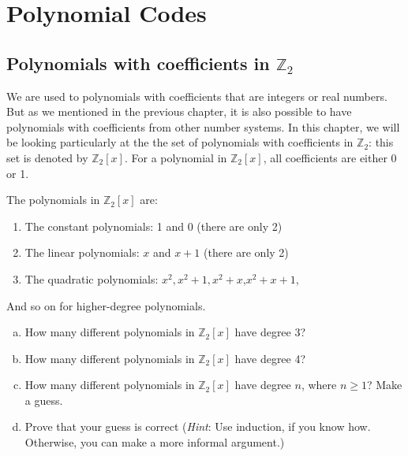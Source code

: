 
\chapter{Polynomial Codes}\label{polycodes}

\section{Polynomials with coefficients in $\mathbb{Z}_2$}\label{sec:polycodes:1}
We are used to polynomials with coefficients that are integers or real numbers. But as we mentioned in the previous chapter, it is also possible to have polynomials with coefficients from other number systems. In this chapter, we will be looking particularly 
at the the set of polynomials with coefficients in  $\mathbb{Z}_2$: this set is denoted by $\mathbb{Z}_2[x]$.
For a polynomial in $\mathbb{Z}_2[x]$, all coefficients are either 0 or 1.

\begin{example}
The polynomials in $\mathbb{Z}_2[x]$ are:
\begin{enumerate}[.]
\item
The constant polynomials: 1 and 0 (there are only 2)
\item
The linear polynomials: $x$ and $x+1$ (there are only 2)
\item
The quadratic polynomials: $x^2, x^2+1, x^2 + x$,$x^2 + x+1$,
\end{enumerate}
And so on for higher-degree polynomials.
\end{example}

\begin{exercise}
\begin{enumerate}[(a)]
\item
How many different polynomials in $\mathbb{Z}_2[x]$ have degree 3?
\item
How many different polynomials in $\mathbb{Z}_2[x]$ have degree 4?
\item
How  many different polynomials in $\mathbb{Z}_2[x]$ have degree $n$, where $n \ge 1$?  Make a guess.
\item
Prove that your guess is correct (\emph{Hint}: Use induction, if you know how.  Otherwise, you can make a more informal argument.)
\end{enumerate}
\end{exercise}

